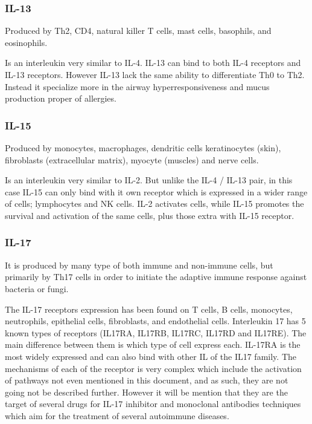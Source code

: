 \subsubsection{IL-13}
\label{in:IL13}

Produced by Th2, CD4, natural killer T cells, mast cells, basophils, and eosinophils.

Is an interleukin very similar to IL-4. IL-13 can bind to both IL-4 receptors and IL-13 receptors. However IL-13 lack the same ability to differentiate Th0 to Th2. Instead it specialize more in the airway hyperresponsiveness and mucus production proper of allergies.

\subsubsection{IL-15}
\label{in:IL15}

Produced by monocytes, macrophages, dendritic cells keratinocytes (skin), fibroblasts (extracellular matrix), myocyte (muscles) and nerve cells.

Is an interleukin very similar to IL-2. But unlike the IL-4 / IL-13 pair, in this case IL-15 can only bind with it own receptor which is expressed in a wider range of cells; lymphocytes and NK cells. IL-2 activates cells, while IL-15 promotes the survival and activation of the same cells, plus those extra with IL-15 receptor.

\subsubsection{IL-17}
\label{in:IL17}

It is produced by many type of both immune and non-immune cells, but primarily by Th17 cells in order to initiate the adaptive immune response against bacteria or fungi.

The IL-17 receptors expression has been found on T cells, B cells, monocytes, neutrophils, epithelial cells, fibroblasts, and endothelial cells. Interleukin 17 has 5 known types of receptors (IL17RA, IL17RB, IL17RC, IL17RD and IL17RE). The main difference between them is which type of cell express each. IL-17RA is the most widely expressed and can also bind with other IL of the IL17 family. The mechanisms of each of the receptor is very complex which include the activation of pathways not even mentioned in this document, and as such, they are not going not be described further. However it will be mention that they are the target of several drugs for IL-17 inhibitor and monoclonal antibodies techniques which aim for the treatment of several autoimmune diseases.

